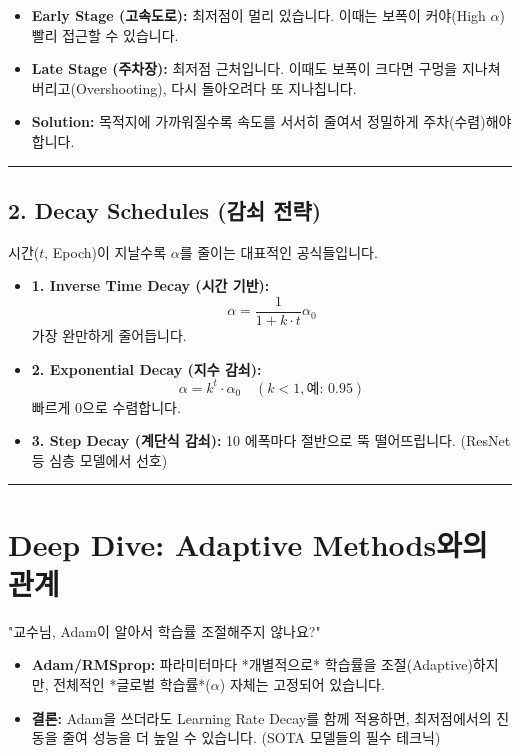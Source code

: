 \documentclass[11pt,a4paper]{book}
\theoremstyle{definition}
\begin{document}
\begin{analogybox}[title={고속도로와 주차장 비유}]
\begin{itemize}
    \item \textbf{Early Stage (고속도로):} 최저점이 멀리 있습니다. 이때는 보폭이 커야(High $\alpha$) 빨리 접근할 수 있습니다.
    \item \textbf{Late Stage (주차장):} 최저점 근처입니다. 이때도 보폭이 크다면 구멍을 지나쳐 버리고(Overshooting), 다시 돌아오려다 또 지나칩니다.
    \item \textbf{Solution:} 목적지에 가까워질수록 속도를 서서히 줄여서 정밀하게 주차(수렴)해야 합니다.
\end{itemize}
\end{analogybox}

\vspace{0.5cm}\hrule\vspace{0.5cm}

\subsection{2. Decay Schedules (감쇠 전략)}
시간($t$, Epoch)이 지날수록 $\alpha$를 줄이는 대표적인 공식들입니다.

\begin{itemize}
    \item \textbf{1. Inverse Time Decay (시간 기반):}
    $$ \alpha = \frac{1}{1 + k \cdot t} \alpha_0 $$
    가장 완만하게 줄어듭니다.
    
    \item \textbf{2. Exponential Decay (지수 감쇠):}
    $$ \alpha = k^t \cdot \alpha_0 \quad (k < 1, \text{예: } 0.95) $$
    빠르게 0으로 수렴합니다.
    
    \item \textbf{3. Step Decay (계단식 감쇠):}
    10 에폭마다 절반으로 뚝 떨어뜨립니다. (ResNet 등 심층 모델에서 선호)
    
\end{itemize}

\vspace{0.5cm}\hrule\vspace{0.5cm}

\section{Deep Dive: Adaptive Methods와의 관계}

"교수님, Adam이 알아서 학습률 조절해주지 않나요?"
\begin{itemize}
    \item \textbf{Adam/RMSprop:} 파라미터마다 *개별적으로* 학습률을 조절(Adaptive)하지만, 전체적인 *글로벌 학습률*($\alpha$) 자체는 고정되어 있습니다.
    \item \textbf{결론:} Adam을 쓰더라도 Learning Rate Decay를 함께 적용하면, 최저점에서의 진동을 줄여 성능을 더 높일 수 있습니다. (SOTA 모델들의 필수 테크닉)
\end{itemize}
\end{document}
